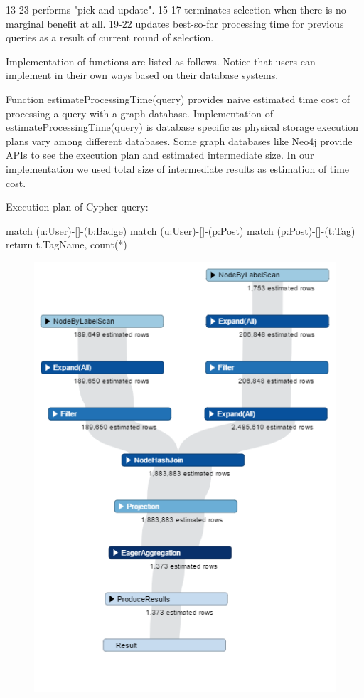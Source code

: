 13-23 performs "pick-and-update". 15-17 terminates selection when there is no marginal benefit at all. 19-22 updates best-so-far processing time for previous queries as a result of current round of selection.

Implementation of functions are listed as follows. Notice that users can implement in their own ways based on their database systems. 

Function estimateProcessingTime(query) provides naive estimated time cost of processing a query with a graph database. Implementation of estimateProcessingTime(query) is database specific as physical storage execution plans vary among different databases. Some graph databases like Neo4j provide APIs to see the execution plan and estimated intermediate size. In our implementation we used total size of intermediate results as estimation of time cost.
  
Execution plan of Cypher query:

match (u:User)-[]-(b:Badge)  match (u:User)-[]-(p:Post)  match (p:Post)-[]-(t:Tag)  return  t.TagName, count(*)

\begin {figure}[H]
\centering
\includegraphics[scale=0.6]{pic/61.png}
\end{figure}

